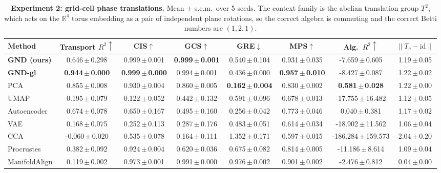 \begin{table}[t]
\centering
\caption{\textbf{Experiment 2: grid-cell phase translations.} Mean $\pm$ s.e.m.\ over 5 seeds. The context family is the abelian translation group $T^2$, which acts on the $\mathbb{R}^4$ torus embedding as a pair of independent plane rotations, so the correct algebra is commuting and the correct Betti numbers are $(1,2,1)$.}
\label{tab:grid}
\vspace{2pt}
\small
\begin{tabular}{lccccccc}
\toprule
Method & Transport $R^2\!\uparrow$ & CIS$\uparrow$ & GCS$\uparrow$ & GRE$\downarrow$ & MPS$\uparrow$ & Alg.\ $R^2\!\uparrow$ & $\|T_c-\mathrm{id}\|$ \\
\midrule
\textbf{GND (ours)} & 0.646\,\tiny{$\pm$\,0.298} & 0.999\,\tiny{$\pm$\,0.001} & \textbf{0.999\,\tiny{$\pm$\,0.001}} & 0.540\,\tiny{$\pm$\,0.104} & 0.931\,\tiny{$\pm$\,0.035} & -7.659\,\tiny{$\pm$\,0.605} & 1.19\,\tiny{$\pm$\,0.05} \\
\textbf{GND-gl} & \textbf{0.944\,\tiny{$\pm$\,0.000}} & \textbf{0.999\,\tiny{$\pm$\,0.000}} & 0.994\,\tiny{$\pm$\,0.001} & 0.436\,\tiny{$\pm$\,0.000} & \textbf{0.957\,\tiny{$\pm$\,0.010}} & -8.427\,\tiny{$\pm$\,0.087} & 1.22\,\tiny{$\pm$\,0.02} \\
\midrule
PCA & 0.855\,\tiny{$\pm$\,0.008} & 0.930\,\tiny{$\pm$\,0.004} & 0.860\,\tiny{$\pm$\,0.005} & \textbf{0.162\,\tiny{$\pm$\,0.004}} & 0.830\,\tiny{$\pm$\,0.002} & \textbf{0.581\,\tiny{$\pm$\,0.028}} & 1.22\,\tiny{$\pm$\,0.00} \\
UMAP & 0.195\,\tiny{$\pm$\,0.079} & 0.122\,\tiny{$\pm$\,0.052} & 0.442\,\tiny{$\pm$\,0.132} & 0.591\,\tiny{$\pm$\,0.096} & 0.678\,\tiny{$\pm$\,0.013} & -17.755\,\tiny{$\pm$\,16.482} & 1.12\,\tiny{$\pm$\,0.05} \\
Autoencoder & 0.674\,\tiny{$\pm$\,0.078} & 0.650\,\tiny{$\pm$\,0.167} & 0.495\,\tiny{$\pm$\,0.160} & 0.256\,\tiny{$\pm$\,0.042} & 0.773\,\tiny{$\pm$\,0.046} & 0.040\,\tiny{$\pm$\,0.381} & 1.17\,\tiny{$\pm$\,0.02} \\
VAE & 0.168\,\tiny{$\pm$\,0.075} & 0.252\,\tiny{$\pm$\,0.113} & 0.287\,\tiny{$\pm$\,0.176} & 0.483\,\tiny{$\pm$\,0.051} & 0.614\,\tiny{$\pm$\,0.034} & -18.902\,\tiny{$\pm$\,11.562} & 1.06\,\tiny{$\pm$\,0.04} \\
CCA & -0.060\,\tiny{$\pm$\,0.020} & 0.535\,\tiny{$\pm$\,0.078} & 0.164\,\tiny{$\pm$\,0.111} & 1.352\,\tiny{$\pm$\,0.171} & 0.597\,\tiny{$\pm$\,0.015} & -186.284\,\tiny{$\pm$\,159.573} & 2.04\,\tiny{$\pm$\,0.20} \\
Procrustes & 0.382\,\tiny{$\pm$\,0.092} & 0.924\,\tiny{$\pm$\,0.004} & 0.620\,\tiny{$\pm$\,0.036} & 0.675\,\tiny{$\pm$\,0.082} & 0.814\,\tiny{$\pm$\,0.005} & -11.186\,\tiny{$\pm$\,8.614} & 1.09\,\tiny{$\pm$\,0.04} \\
ManifoldAlign & 0.119\,\tiny{$\pm$\,0.002} & 0.973\,\tiny{$\pm$\,0.001} & 0.991\,\tiny{$\pm$\,0.000} & 0.976\,\tiny{$\pm$\,0.002} & 0.901\,\tiny{$\pm$\,0.002} & -2.476\,\tiny{$\pm$\,0.812} & 0.04\,\tiny{$\pm$\,0.00} \\
\bottomrule
\end{tabular}
\end{table}
